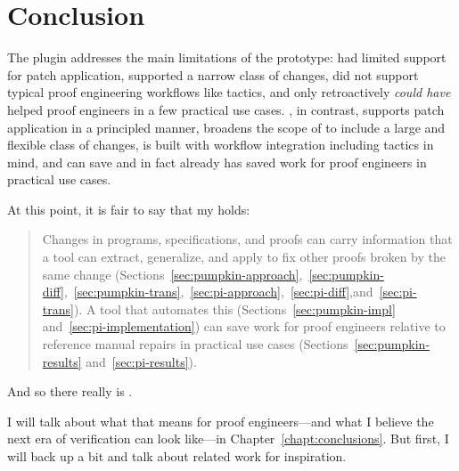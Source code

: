 \section{Conclusion}
\label{sec:pi-concl}

The \toolnamec plugin addresses the main limitations of the \sysname prototype:
\sysname had limited support for patch application,
supported a narrow class of changes,
did not support typical proof engineering workflows like tactics,
and only retroactively \textit{could have} helped proof engineers in a few practical use cases.
\toolnamec, in contrast, supports patch application in a principled manner,
broadens the scope of \sysnamelong to include a large and flexible class of changes,
is built with workflow integration including tactics in mind,
and can save and in fact already has saved work for proof engineers in practical use cases.

At this point, it is fair to say that my  holds:

\begin{quote}
Changes in programs, specifications, and proofs can carry information that a tool can extract, generalize, and apply to fix other proofs broken by the same change (Sections~\ref{sec:pumpkin-approach},~\ref{sec:pumpkin-diff},~\ref{sec:pumpkin-trans},~\ref{sec:pi-approach},~\ref{sec:pi-diff},and~\ref{sec:pi-trans}). A tool that automates this (Sections~\ref{sec:pumpkin-impl} and~\ref{sec:pi-implementation}) can save work for proof engineers relative to reference manual repairs in 
practical use cases (Sections~\ref{sec:pumpkin-results} and~\ref{sec:pi-results}).
\end{quote}
And so there really is .

I will talk about what that means for proof engineers---and what I believe the next era of verification can look like---in Chapter~\ref{chapt:conclusions}.
But first, I will back up a bit and talk about related work for inspiration.
